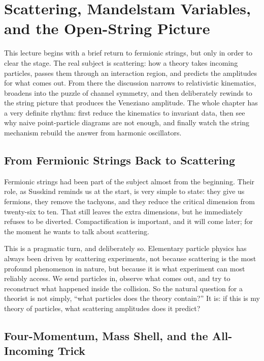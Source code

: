 \chapter{Scattering, Mandelstam Variables, and the Open-String Picture}

This lecture begins with a brief return to fermionic strings, but only in order to clear the stage. The real subject is scattering: how a theory takes incoming particles, passes them through an interaction region, and predicts the amplitudes for what comes out. From there the discussion narrows to relativistic kinematics, broadens into the puzzle of channel symmetry, and then deliberately rewinds to the string picture that produces the Veneziano amplitude. The whole chapter has a very definite rhythm: first reduce the kinematics to invariant data, then see why naive point-particle diagrams are not enough, and finally watch the string mechanism rebuild the answer from harmonic oscillators.

\section{From Fermionic Strings Back to Scattering}

Fermionic strings had been part of the subject almost from the beginning. Their role, as Susskind reminds us at the start, is very simple to state: they give us fermions, they remove the tachyons, and they reduce the critical dimension from twenty-six to ten. That still leaves the extra dimensions, but he immediately refuses to be diverted. Compactification is important, and it will come later; for the moment he wants to talk about scattering.

This is a pragmatic turn, and deliberately so. Elementary particle physics has always been driven by scattering experiments, not because scattering is the most profound phenomenon in nature, but because it is what experiment can most reliably access. We send particles in, observe what comes out, and try to reconstruct what happened inside the collision. So the natural question for a theorist is not simply, ``what particles does the theory contain?'' It is: if this is my theory of particles, what scattering amplitudes does it predict?

\section{Four-Momentum, Mass Shell, and the All-Incoming Trick}

